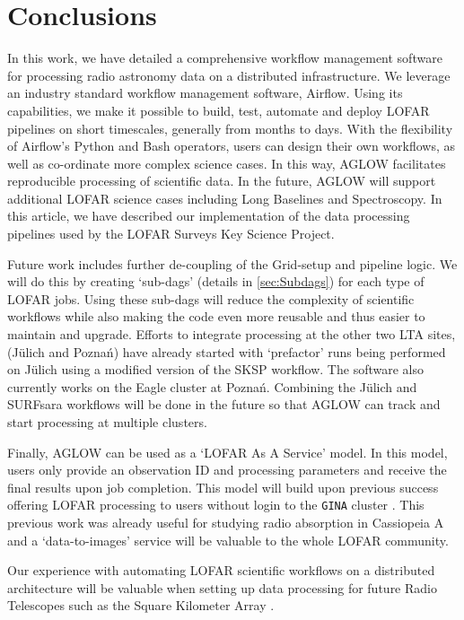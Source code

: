 \section{Conclusions}\label{sec:conclusions}

In this work, we have detailed a comprehensive workflow management software for processing radio astronomy data on a distributed infrastructure. We leverage an industry standard workflow management software, Airflow. Using its capabilities, we make it possible to build, test, automate and deploy LOFAR pipelines on short timescales, generally from months to days. With the flexibility of Airflow's Python and Bash operators, users can design their own workflows, as well as co-ordinate more complex science cases. In this way, AGLOW facilitates reproducible processing of scientific data. In the future, AGLOW will support additional LOFAR science cases including Long Baselines and Spectroscopy. In this article, we have described our implementation of the data processing pipelines used by the LOFAR Surveys Key Science Project. 

Future work includes further de-coupling of the Grid-setup and pipeline logic. We will do this by creating `sub-dags' (details in \ref{sec:Subdags}) for each type of LOFAR jobs. Using these sub-dags will reduce the complexity of scientific workflows while also making the code even more reusable and thus easier to maintain and upgrade. Efforts to integrate processing at the other two LTA sites, (J\"{u}lich and Pozna\'{n}) have already started with `prefactor' runs being performed on J\"{u}lich using a modified version of the SKSP workflow. The software also currently works on the Eagle cluster at Pozna\'{n}. Combining the J\"{u}lich and SURFsara workflows will be done in the future so that AGLOW can track and start processing at multiple clusters. 

Finally, AGLOW can be used as a `LOFAR As A Service' model.  In this model, users only provide an observation ID and processing parameters and receive the final results upon job completion. This model will build upon previous success offering LOFAR processing to users without login to the \texttt{GINA} cluster \cite{oonk_prep}. This previous work was already useful for studying radio absorption in Cassiopeia A \cite{Arias2018} and a `data-to-images' service will be valuable to the whole LOFAR community.

Our experience with automating LOFAR scientific workflows on a distributed architecture will be valuable when setting up data processing for future Radio Telescopes such as the Square Kilometer Array \cite{ska} . 


